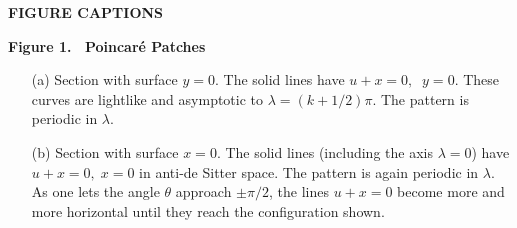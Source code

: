 

\newpage

\centerline{\bf FIGURE CAPTIONS}

\bigskip
\noindent
{\bf Figure 1. \ Poincar\'e Patches}
\begin{enumerate}
\item[(a)] Section with surface $y=0$. The solid lines have $u+x=0,\;\; y=0$.
These
 curves are lightlike and asymptotic to $\lambda = (k+1/2)\pi$. The pattern is
 periodic in $\lambda$.

\item[(b)] Section with surface $x=0$. The solid lines (including the axis
$\lambda
 =0$) have  $u+x =0,\; x=0$ in anti-de Sitter space. The pattern
is again periodic in $\lambda$. As one lets the angle  $\theta$ approach
$\pm \pi/2$, the lines $u+x=0$ become more and more horizontal until they
reach the configuration shown.
\end{enumerate}
\bigskip

